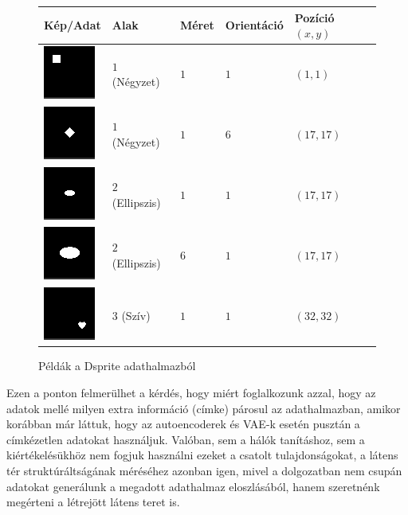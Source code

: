 \begin{figure}[h!]
\begin{center}

\begin{tabular}{| m{2.5cm} | m{2.5cm} | m{2cm}  | m{2cm} |  m{2.5cm} |}
\hline
Kép/Adat & Alak & Méret & Orientáció & Pozíció $(x,y)$ \\
\hline\hline
\includegraphics{sample00000.png} & $1$ (Négyzet) & $1$ & $1$ & $(1,1)$ \\
\hline
\includegraphics{sample0051616.png} & $1$ (Négyzet) & $1$ & $6$ & $(17,17)$ \\
\hline
\includegraphics{sample1001616.png} & $2$ (Ellipszis) & $1$ & $1$ & $(17,17)$ \\
\hline
\includegraphics{sample1501616.png} & $2$ (Ellipszis) & $6$ & $1$ & $(17,17)$ \\
\hline
\includegraphics{sample2003131.png} & $3$ (Szív) & $1$ & $1$ & $(32,32)$ \\
\hline
\end{tabular}
\end{center}
\caption{Példák a Dsprite adathalmazból}\label{samples}
\end{figure}

Ezen a ponton felmerülhet a kérdés, hogy miért foglalkozunk azzal, hogy az adatok mellé milyen extra információ (címke) párosul az adathalmazban, amikor korábban már láttuk, hogy az autoencoderek és VAE-k esetén pusztán a címkézetlen adatokat használjuk. Valóban, sem a hálók tanításhoz, sem a kiértékelésükhöz nem fogjuk használni ezeket a csatolt tulajdonságokat, a látens tér struktúráltságának méréséhez azonban igen, mivel a dolgozatban nem csupán adatokat generálunk a megadott adathalmaz eloszlásából, hanem szeretnénk megérteni a létrejött látens teret is.

